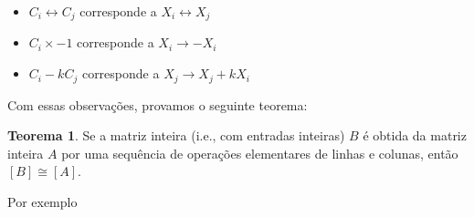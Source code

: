 \documentclass[a4paper,portuguese,11pt,twoside, leqno]{book}
\theoremstyle{definition}
\newtheorem{theorem}{Teorema}[section]
\begin{document}
	\begin{itemize}
		\item $C_i\leftrightarrow C_j$ corresponde a $X_i\leftrightarrow X_j$
		\item $C_i\times-1$ corresponde a $X_i\to -X_i$
		\item $C_i -kC_j$ corresponde a $X_j\to X_j + kX_i$
	\end{itemize}
	\par\vspace{0.3cm} Com essas observações, provamos o seguinte teorema:
	\begin{theorem}
		\label{equivalencia matrizes}
		Se a matriz inteira (i.e., com entradas inteiras) $B$ é obtida da matriz inteira $A$ por uma sequência de operações elementares de linhas e colunas, então $[B]\cong[A]$.
	\end{theorem}
	\par\vspace{0.3cm} Por exemplo
\end{document}
